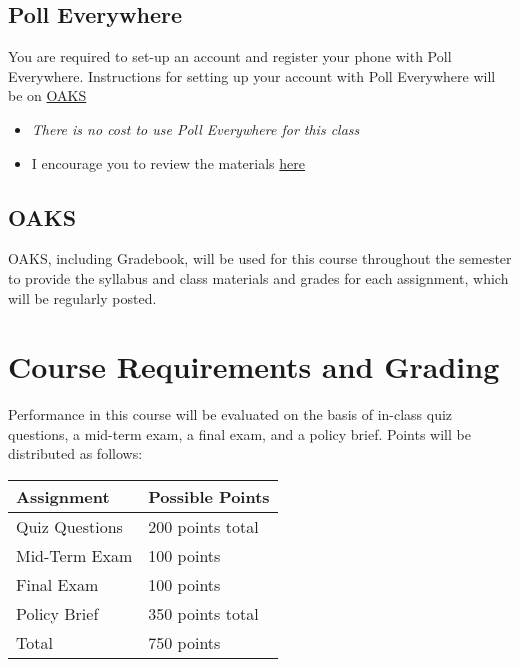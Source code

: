 \hypertarget{poll-everywhere}{%
\subsection{Poll Everywhere}\label{poll-everywhere}}

You are required to set-up an account and register your phone with Poll
Everywhere. Instructions for setting up your account with Poll
Everywhere will be on \href{https://lms.cofc.edu}{OAKS}

\begin{itemize}
\item
  \emph{There is no cost to use Poll Everywhere for this class}
\item
  I encourage you to review the materials
  \href{https://blog.polleverywhere.com/students-poll-everywhere-101/}{here}
\end{itemize}

\hypertarget{oaks}{%
\subsection{OAKS}\label{oaks}}

OAKS, including Gradebook, will be used for this course throughout the
semester to provide the syllabus and class materials and grades for each
assignment, which will be regularly posted.

\hypertarget{course-requirements-and-grading}{%
\section{Course Requirements and
Grading}\label{course-requirements-and-grading}}

Performance in this course will be evaluated on the basis of in-class
quiz questions, a mid-term exam, a final exam, and a policy brief.
Points will be distributed as follows:

\vspace{0.1in}
\begin{tabular}{ l l}
\hline
Assignment & Possible Points \\ 
\hline
Quiz Questions & 200 points total \\
Mid-Term Exam & 100 points \\ 
Final Exam & 100 points \\
Policy Brief &  350 points total \\
\hline
Total &  750 points \\
\hline
\end{tabular}

